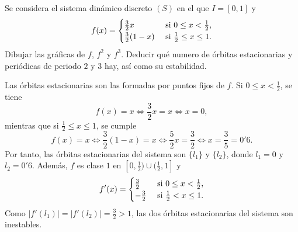 \documentclass[11pt]{report}
\begin{document}
\begin{exercise}
    Se considera el sistema dinámico discreto $(S)$ en el que $I = [0,1]$ y
    \[f(x) = \begin{cases}
        \frac{3}{2}x & $ si $ 0 \leq x < \frac{1}{2}, \\
        \frac{3}{2}(1-x) & $ si $ \frac{1}{2} \leq x \leq 1.
    \end{cases}\]
    Dibujar las gráficas de $f$, $f^2$ y $f^3$. Deducir qué numero de órbitas estacionarias y periódicas de periodo $2$ y $3$ hay, así como su estabilidad.
\end{exercise}

\begin{solution}
    Las órbitas estacionarias son las formadas por puntos fijos de $f$. Si $0 \leq x < \frac{1}{2}$, se tiene
    \[f(x) = x \iff \frac{3}{2}x = x \iff x = 0,\]
    mientras que si $\frac{1}{2} \leq x \leq 1$, se cumple
    \[f(x) = x \iff \frac{3}{2}(1-x) = x \iff \frac{5}{2}x = \frac{3}{2} \iff x = \frac{3}{5} = 0'6.\]
    Por tanto, las órbitas estacionarias del sistema son $\{l_1\}$ y $\{l_2\}$, donde $l_1 = 0$ y $l_2 = 0'6$. Además, $f$ es clase $1$ en $[0,\frac{1}{2}) \cup (\frac{1}{2},1]$ y
    \[f'(x) = \begin{cases}
        \frac{3}{2} & $ si $ 0 \leq x < \frac{1}{2}, \\
        -\frac{3}{2} & $ si $ \frac{1}{2} < x \leq 1.
    \end{cases}\]
    Como $|f'(l_1)| = |f'(l_2)| = \frac{3}{2} > 1$, las dos órbitas estacionarias del sistema son inestables.


\end{solution}
\end{document}
